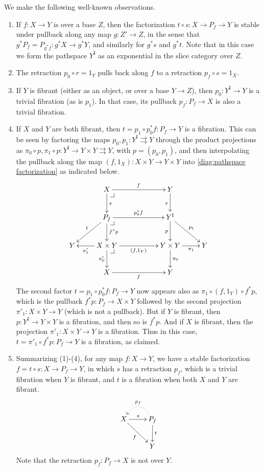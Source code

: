 \documentclass[12pt]{article}
\makeatletter
\newcommand{\ra}{\ensuremath{\rightarrow}}
\newcommand{\I}{\ensuremath{\mathrm{I}}}
\theoremstyle{remark}
\theoremstyle{definition}
\newcommand{\pbcorner}[1][dr]{\save*!/#1-1.2pc/#1:(-1,1)@^{|-}\restore}
\makeatother
\begin{document}
We make the following well-known observations.
\begin{enumerate}
\item If $f:X\ra Y$ is over a base $Z$, then the factorization $t\circ s:X\ra P_f \ra Y$ is stable under pullback along any map $g : Z' \ra Z$, in the sense that $g^*P_f = P_{g^*f} : g^*X \ra g^* Y$, and similarly for $g^*s$ and $g^*t$.  Note that in this case we form the pathspace $Y^\I$ as an exponential in the slice category over $Z$.

\item The retraction $p_0\circ r = 1_Y$ pulls back along $f$ to a retraction $p_f \circ s =1_X$.

\item If $Y$ is fibrant (either as an object, or over a base $Y\ra Z$), then $p_0 : Y^\I \ra Y$ is a trivial fibration (as is $p_1$).  In that case, its pullback $p_f : P_f \ra X$ is also a trivial fibration.

\item If $X$ and $Y$ are both fibrant, then $t= p_1\circ p_0^*f : P_f \ra Y$ is a fibration.  This can be seen by factoring the maps $p_0, p_1 :Y^\I \rightrightarrows  Y$ through the product projections as $\pi_0\circ p, \pi_1\circ p : Y^\I \ra Y\times Y \rightrightarrows Y$, with $p = (p_0, p_1)$, and then interpolating the pullback along the map $(f,1_X) : X\times Y\ra Y\times Y$ into \eqref{diag:pathspace factorization} as indicated below.
\begin{equation}\label{diag:pathspace factorization2}
\xymatrix{
& X \ar[d]^s \ar[rr]^f \pbcorner && Y \ar[d]_r \\
& \ar[ld]_t P_f  \ar[d]^{f^*p} \ar[rr]^{p_0^*f} \pbcorner && Y^\I \ar[d]_{p} \ar[rd]^{p_1}\\
Y & \ar[l]^-{\pi'_1} X\times Y\ar[d]_-{\pi'_0} \ar[rr]_{(f,1_Y)} \pbcorner  &&  Y\times Y \ar[d]^{\pi_0} \ar[r]_-{\pi_1} & Y \\
& X \ar[rr]_f  &&  Y &
}
\end{equation}
The second factor $t = p_1\circ p_0^*f : P_f \ra Y$ now appears also as $\pi_1\circ(f,1_Y)\circ f^*p$, which is the pullback $f^*p: P_f \ra X\times Y$ followed by the second projection $\pi'_1 : X\times Y \ra Y$ (which is not a pullback). But if $Y$ is fibrant, then $p : Y^\I \ra Y\times Y$ is a fibration, and then so is $f^*p$. And if $X$ is fibrant, then the projection $\pi'_1:X\times Y \ra Y$ is a fibration. Thus in this case, $t = \pi'_1\circ f^*p : P_f \ra Y$ is a fibration, as claimed.

\item Summarizing (1)-(4), for any map $f : X\ra Y$, we have a stable factorization $f = t\circ s : X\ra P_f \ra Y$, in which $s$ has a retraction $p_f$, which is a trivial fibration when $Y$ is fibrant, and $t$ is a fibration when both $X$ and $Y$ are fibrant.  \begin{equation}\label{diag:pathspace factorization3}
\xymatrix{
X \ar[r]^s \ar[rd]_f & \ar@{.>}@/_1.5pc/[l]_{p_f} P_f \ar[d]^t \\
& Y
}
\end{equation}
Note that the retraction $p_f : P_f \ra X$ is not over $Y$.
\end{enumerate}
\end{document}

